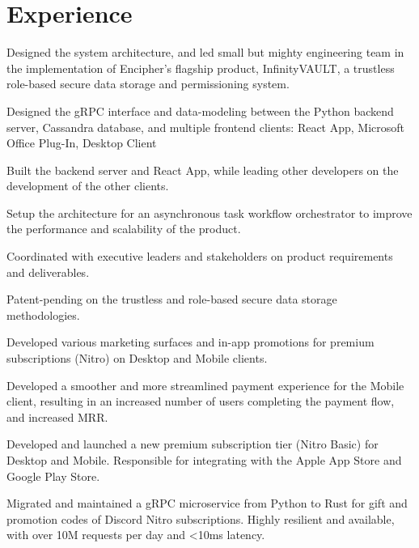 \documentclass[letterpaper]{deedy-resume-openfont} %
\begin{document}
\begin{minipage}[t]{0.71\textwidth} %


\section{Experience}
\sectionheadersep

\sectionsep

\begin{tightemize}
\item Designed the system architecture, and led small but mighty engineering team in the implementation of Encipher's flagship product, InfinityVAULT, a trustless role-based secure data storage and permissioning system.
\item Designed the gRPC interface and data-modeling between the Python backend server, Cassandra database, and multiple frontend clients: React App, Microsoft Office Plug-In, Desktop Client
\item Built the backend server and React App, while leading other developers on the development of the other clients. 
\item Setup the architecture for an asynchronous task workflow orchestrator to improve the performance and scalability of the product.
\item Coordinated with executive leaders and stakeholders on product requirements and deliverables.
\item Patent-pending on the trustless and role-based secure data storage methodologies.
\end{tightemize}

\sectionsep %


\begin{tightemize}
\item Developed various marketing surfaces and in-app promotions for premium subscriptions (Nitro) on Desktop and Mobile clients.
\item Developed a smoother and more streamlined payment experience for the Mobile client, resulting in an increased number of users completing the payment flow, and increased MRR.
\item Developed and launched a new premium subscription tier (Nitro Basic) for Desktop and Mobile. Responsible for integrating with the Apple App Store and Google Play Store. 
\item Migrated and maintained a gRPC microservice from Python to Rust for gift and promotion codes of Discord Nitro subscriptions. Highly resilient and available, with over 10M requests per day and <10ms latency.
\end{tightemize}


\end{minipage}
\end{document}
